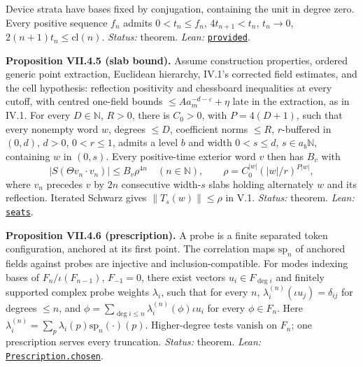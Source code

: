 \documentclass[
  letterpaper,
  11pt]{article}
\newcounter{none} %
\begin{document}
Device strata have bases fixed by conjugation, containing the unit in
degree zero. Every positive sequence \(f_n\) admits \(0<t_n\le f_n\),
\(4t_{n+1}<t_n\), \(t_n\to0\), \(2(n+1)t_n\le\mathrm{cl}(n)\).
\emph{Status:} theorem. \emph{Lean:}
\href{https://github.com/yang-mills-group/OpenAI-YM-20261028/blob/3456e5e75cf8d4cd558955a5c7638fba2d68f464/YM/Contacts/Solstice/Result.lean\#L65-L69}{\texttt{provided}}.

\textbf{Proposition VII.4.5 (slab bound).} Assume construction
properties, ordered generic point extraction, Euclidean hierarchy,
IV.1's corrected field estimates, and the cell hypothesis: reflection
positivity and chessboard inequalities at every cutoff, with centred
one-field bounds \(\le Aa_m^{-d-\varepsilon}+\eta\) late in the
extraction, as in IV.1. For every \(D\in\mathbb N\), \(R>0\), there is
\(C_0>0\), with \(P=4(D+1)\), such that every nonempty word \(w\),
degrees \(\le D\), coefficient norms \(\le R\), \(r\)-buffered in
\((0,d)\), \(d>0\), \(0<r\le1\), admits a level \(b\) and width
\(0<s\le d\), \(s\in a_b\mathbb N\), containing \(w\) in \((0,s)\).
Every positive-time exterior word \(v\) then has \(B_v\) with
\[|S(\Theta v_n\cdot v_n)|\le B_v\rho^{4n}\quad(n\in\mathbb N),\qquad \rho=C_0^{|w|}(|w|/r)^{P|w|},\]
where \(v_n\) precedes \(v\) by \(2n\) consecutive width-\(s\) slabs
holding alternately \(w\) and its reflection. Iterated Schwarz gives
\(\|T_s(w)\|\le\rho\) in V.1. \emph{Status:} theorem. \emph{Lean:}
\href{https://github.com/yang-mills-group/OpenAI-YM-20261028/blob/3456e5e75cf8d4cd558955a5c7638fba2d68f464/YM/Next/PHASE/Seats.lean\#L154-L160}{\texttt{seats}}.

\textbf{Proposition VII.4.6 (prescription).} A probe is a finite
separated token configuration, anchored at its first point. The
correlation maps \(\mathrm{sp}_n\) of anchored fields against probes are
injective and inclusion-compatible. For modes indexing bases of
\(F_n/\iota(F_{n-1})\), \(F_{-1}=0\), there exist vectors
\(u_i\in F_{\deg i}\) and finitely supported complex probe weights
\(\lambda_i\), such that for every \(n\),
\(\lambda_i^{(n)}(\iota u_j)=\delta_{ij}\) for degrees \(\le n\), and
\(\phi=\sum_{\deg i\le n}\lambda_i^{(n)}(\phi)\iota u_i\) for every
\(\phi\in F_n\). Here
\(\lambda_i^{(n)}=\sum_p\lambda_i(p)\mathrm{sp}_n(\cdot)(p)\).
Higher-degree tests vanish on \(F_n\); one prescription serves every
truncation. \emph{Status:} theorem. \emph{Lean:}
\href{https://github.com/yang-mills-group/OpenAI-YM-20261028/blob/3456e5e75cf8d4cd558955a5c7638fba2d68f464/YM/OPE/Splitting/Legacy.lean\#L20-L31}{\texttt{Prescription.chosen}}.
\end{document}
